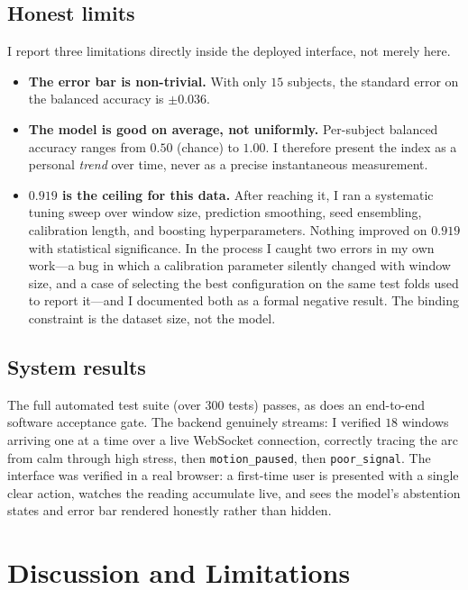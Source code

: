 \documentclass[11pt,a4paper]{article}
\begin{document}
\subsection{Honest limits}
I report three limitations directly inside the deployed interface, not merely here.

\begin{itemize}[leftmargin=1.4em,itemsep=0.15em]
  \item \textbf{The error bar is non-trivial.} With only $15$ subjects, the standard error on the
        balanced accuracy is $\pm 0.036$.
  \item \textbf{The model is good on average, not uniformly.} Per-subject balanced accuracy ranges
        from $0.50$ (chance) to $1.00$. I therefore present the index as a personal \emph{trend}
        over time, never as a precise instantaneous measurement.
  \item \textbf{$0.919$ is the ceiling for this data.} After reaching it, I ran a systematic tuning
        sweep over window size, prediction smoothing, seed ensembling, calibration length, and
        boosting hyperparameters. Nothing improved on $0.919$ with statistical significance. In the
        process I caught two errors in my own work---a bug in which a calibration parameter silently
        changed with window size, and a case of selecting the best configuration on the same test
        folds used to report it---and I documented both as a formal negative result. The binding
        constraint is the dataset size, not the model.
\end{itemize}

\subsection{System results}
The full automated test suite (over $300$ tests) passes, as does an end-to-end software acceptance
gate. The backend genuinely streams: I verified $18$ windows arriving one at a time over a live
WebSocket connection, correctly tracing the arc from calm through high stress, then
\texttt{motion\_paused}, then \texttt{poor\_signal}. The interface was verified in a real browser: a
first-time user is presented with a single clear action, watches the reading accumulate live, and
sees the model's abstention states and error bar rendered honestly rather than hidden.

\section{Discussion and Limitations}
\end{document}
